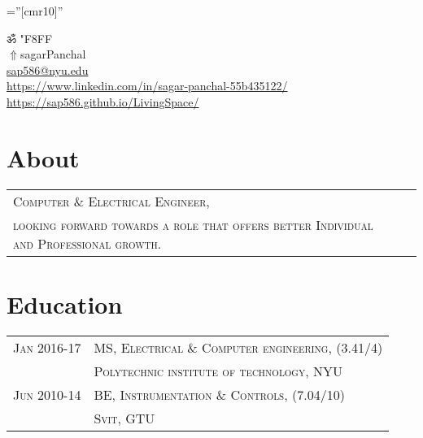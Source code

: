 \documentclass[a4paper]{article}
\newcommand{\apple}{\char"F8FF}
\begin{document}
\pagestyle{empty} 						%
\font\fb=''[cmr10]'' 						%

\par	{\centering
	ॐ
	{\setmainfont{Apple Chancery} \apple}																														\\
	\href{https://sap586.github.io/LivingSpace/}{$ \Uparrow$}{sagarPanchal}																										\\
	\small \href{mailto:sap586@nyu.edu}{sap586@nyu.edu}																						\\
	\small \href{https://www.linkedin.com/in/sagar-panchal-55b435122/}{https://www.linkedin.com/in/sagar-panchal-55b435122/}		\textbullet \href{https://sap586.github.io/LivingSpace/}{https://sap586.github.io/LivingSpace/}		\par}
	
\section	{	About		}
	\begin{tabular}{ll}
		\textsc{	Computer \& Electrical Engineer,					}\\
		\textsc{	looking forward towards a role that offers better Individual and Professional growth.	}
	\\\end{tabular}



\section	{	Education		}
	\begin{tabular}{rl}
		\small{}\textsc{		Jan 2016-17	} 		& 		\textsc{	MS, Electrical \& Computer engineering, 		\small {(3.41/4)}			}	\\
 											& 		\textsc{	Polytechnic institute of technology, NYU							}	\\
 		\small{}\textsc{		Jun 2010-14	} 		& 		\textsc{	BE, Instrumentation \small{\&} Controls,		\small {(7.04/10)}		}	\\
 											& 		\textsc{	Svit, GTU													}	\\
	\end{tabular}

\end{document}
